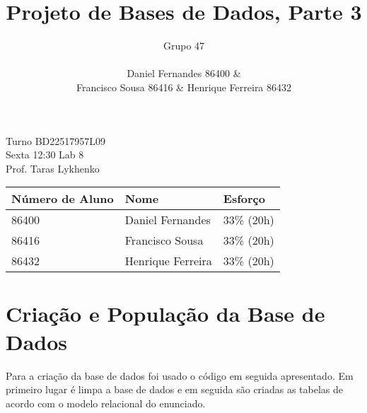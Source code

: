 \documentclass[10pt,a4paper]{article}
\author{Grupo 47 \\\\ Daniel Fernandes 86400 \& \\Francisco Sousa 86416 \& Henrique Ferreira 86432}
\title{Projeto de Bases de Dados, Parte 3}
\begin{document}
\maketitle

\begin{center}
Turno BD22517957L09 \\
Sexta 12:30 Lab 8 \\
Prof. Taras Lykhenko \\
\end{center}

\begin{table}[h]
    \centering
    \begin{tabular}{lll}
    \hline
    \textbf{Número de Aluno} & \textbf{Nome} & \textbf{Esforço} \\ \hline
    86400 & Daniel Fernandes & 33\% (20h) \\ \hline
    86416 & Francisco Sousa & 33\% (20h) \\ \hline
    86432 & Henrique Ferreira & 33\% (20h) \\ \hline
    \end{tabular}
\end{table}
\newpage

\section{Criação e População da Base de Dados}

Para a criação da base de dados foi usado o código em seguida apresentado.
Em primeiro lugar é limpa a base de dados e em seguida são criadas as tabelas de acordo com o modelo relacional do enunciado. 
\end{document}
